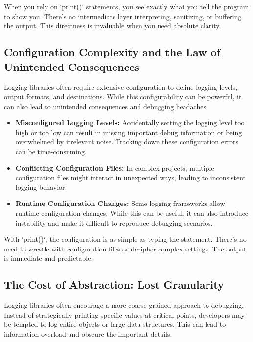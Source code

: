 \documentclass{article}
\begin{document}
{{{{When you rely on `print()` statements, you see exactly what you tell the program to show you. There's no intermediate layer interpreting, sanitizing, or buffering the output. This directness is invaluable when you need absolute clarity.

\subsection*{Configuration Complexity and the Law of Unintended Consequences}

Logging libraries often require extensive configuration to define logging levels, output formats, and destinations. While this configurability can be powerful, it can also lead to unintended consequences and debugging headaches.

\begin{itemize}
    \itemsep0em
    \item \textbf{Misconfigured Logging Levels:} Accidentally setting the logging level too high or too low can result in missing important debug information or being overwhelmed by irrelevant noise. Tracking down these configuration errors can be time-consuming.
    \item \textbf{Conflicting Configuration Files:} In complex projects, multiple configuration files might interact in unexpected ways, leading to inconsistent logging behavior.
    \item \textbf{Runtime Configuration Changes:} Some logging frameworks allow runtime configuration changes. While this can be useful, it can also introduce instability and make it difficult to reproduce debugging scenarios.
\end{itemize}

With `print()`, the configuration is as simple as typing the statement. There's no need to wrestle with configuration files or decipher complex settings. The output is immediate and predictable.

\subsection*{The Cost of Abstraction: Lost Granularity}

Logging libraries often encourage a more coarse-grained approach to debugging. Instead of strategically printing specific values at critical points, developers may be tempted to log entire objects or large data structures. This can lead to information overload and obscure the important details.

}}}}
\end{document}
